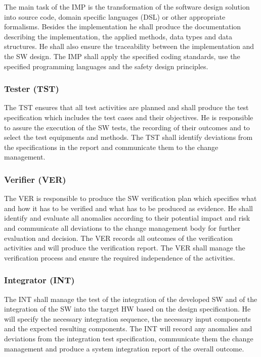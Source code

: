 The main task of the IMP is the transformation of the software design solution
into source code, domain specific languages (DSL) or other appropriate
formalisms. Besides the implementation he shall produce the documentation
describing the implementation, the applied methods, data types and data
structures. He shall also ensure the traceability between the implementation and
the SW design. The IMP shall apply the specified coding standards, use the
specified programming languages and the safety design principles.

\subsubsection{Tester (TST)}
\label{sec:tester}

The TST ensures that all test activities are planned and shall produce the test
specification which includes the test cases and their objectives. He is
responsible to assure the execution of the SW tests, the recording of their
outcomes and to select the test equipments and methods. The TST shall identify
deviations from the specifications in the report and communicate them to the
change management.

\subsubsection{Verifier (VER)}
\label{sec:verifier}

The VER is responsible to produce the SW verification plan which specifies what
and how it has to be verified and what has to be produced as evidence. He shall
identify and evaluate all anomalies according to their potential impact and risk
and communicate all deviations to the change management body for further
evaluation and decision. The VER records all outcomes of the verification
activities and will produce the verification report. The VER shall manage the
verification process and ensure the required independence of the activities.

\subsubsection{Integrator (INT)}
\label{sec:integrator}

The INT shall manage the test of the integration of the developed SW and of the
integration of the SW into the target HW based on the design specification. He
will specify the necessary integration sequence, the necessary input components
and the expected resulting components. The INT will record any anomalies and
deviations from the integration test specification, communicate them the change
management and produce a system integration report of the overall outcome.

